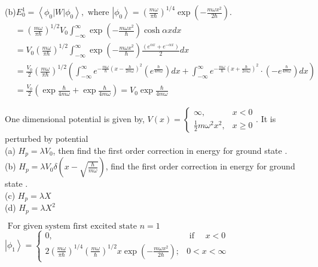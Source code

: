 \begin{enumerate}
\begin{answer}
	(b)$ E_{0}^{1}=\left\langle\phi_{0}|W| \phi_{0}\right\rangle, \text { where }\left|\phi_{0}\right\rangle=\left(\frac{m \omega}{\pi \hbar}\right)^{1 / 4} \exp \left(-\frac{m \omega x^{2}}{2 \hbar}\right) \text {. }$\\
	\begin{align*}
		&=\left(\frac{m \omega}{\pi \hbar}\right)^{1 / 2} V_{0} \int_{-\infty}^{\infty} \exp \left(-\frac{m \omega x^{2}}{\hbar}\right) \cosh \alpha x d x \\
		&=V_{0}\left(\frac{m \omega}{\pi \hbar}\right)^{1 / 2} \int_{-\infty}^{\infty} \exp \left(-\frac{m \omega x^{2}}{\hbar}\right) \frac{\left(e^{\alpha x}+e^{-\alpha x}\right)}{2} d x \\
		&=\frac{V_{0}}{2}\left(\frac{m \omega}{\pi \hbar}\right)^{1 / 2}\left(\int_{-\infty}^{\infty} e^{-\frac{m \omega}{\hbar}\left(x-\frac{\hbar}{2 m \omega}\right)^{2}}\left(e^{\frac{\hbar}{4 m \omega}}\right) d x+\int_{-\infty}^{\infty} e^{-\frac{m \omega}{\hbar}\left(x+\frac{\hbar}{2 m \omega}\right)^{2}} \cdot\left(-e^{\frac{\hbar}{4 m \omega}}\right) d x\right) \\
		&=\frac{V_{0}}{2}\left(\exp \frac{\hbar}{4 m \omega}+\exp \frac{\hbar}{4 m \omega}\right)=V_{0} \exp \frac{\hbar}{4 m \omega}
	\end{align*}
\end{answer}
	\begin{minipage}{\textwidth}
	\item
	One dimensional potential is given by, $V(x)=\left\{\begin{array}{ll}\infty, & x<0 \\ \frac{1}{2} m \omega^{2} x^{2}, & x \geq 0\end{array} .\right.$ It is perturbed by potential\\
	(a) $H_{p}=\lambda V_{0}$, then find the first order correction in energy for ground state .\\
	(b) $H_{p}=\lambda V_{0} \delta\left(x-\sqrt{\frac{\hbar}{m \omega}}\right)$, find the first order correction in energy for ground state .\\
	(c) $H_{p}=\lambda X$\\
	(d) $H_{p}=\lambda X^{2}$\\
\end{minipage}
\begin{answer}
	$\text { For given system first excited state } n=1$\\
	$\left|\phi_{1}\right\rangle= \begin{cases}0, & \text { if } \quad x<0 \\ 2\left(\frac{m \omega}{\pi \hbar}\right)^{1 / 4}\left(\frac{m \omega}{\hbar}\right)^{1 / 2} x \exp \left(-\frac{m \omega x^{2}}{2 \hbar}\right) ; & 0<x<\infty\end{cases}$\\

\end{answer}
\end{enumerate}
